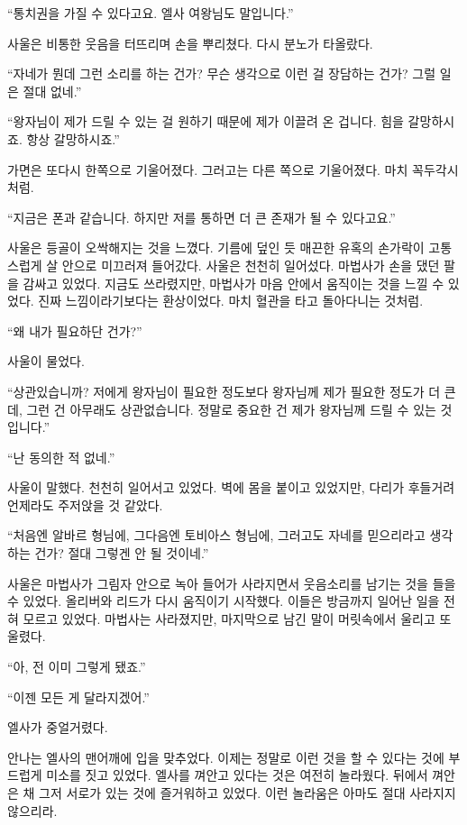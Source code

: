 ``통치권을 가질 수 있다고요. 엘사 여왕님도 말입니다.''

사울은 비통한 웃음을 터뜨리며 손을 뿌리쳤다. 다시 분노가 타올랐다.

``자네가 뭔데 그런 소리를 하는 건가? 무슨 생각으로 이런 걸 장담하는 건가? 그럴 일은 절대 없네.''

``왕자님이 제가 드릴 수 있는 걸 원하기 때문에 제가 이끌려 온 겁니다. 힘을 갈망하시죠. 항상 갈망하시죠.''

가면은 또다시 한쪽으로 기울어졌다. 그러고는 다른 쪽으로 기울어졌다. 마치 꼭두각시처럼.

``지금은 폰과 같습니다. 하지만 저를 통하면 더 큰 존재가 될 수 있다고요.''

사울은 등골이 오싹해지는 것을 느꼈다. 기름에 덮인 듯 매끈한 유혹의 손가락이 고통스럽게 살 안으로 미끄러져 들어갔다. 사울은 천천히 일어섰다. 마법사가 손을 댔던 팔을 감싸고 있었다. 지금도 쓰라렸지만, 마법사가 마음 안에서 움직이는 것을 느낄 수 있었다. 진짜 느낌이라기보다는 환상이었다. 마치 혈관을 타고 돌아다니는 것처럼.

``왜 내가 필요하단 건가?''

사울이 물었다.

``상관있습니까? 저에게 왕자님이 필요한 정도보다 왕자님께 제가 필요한 정도가 더 큰데, 그런 건 아무래도 상관없습니다. 정말로 중요한 건 제가 왕자님께 드릴 수 있는 것입니다.''

``난 동의한 적 없네.''

사울이 말했다. 천천히 일어서고 있었다. 벽에 몸을 붙이고 있었지만, 다리가 후들거려 언제라도 주저앉을 것 같았다.

``처음엔 알바르 형님에, 그다음엔 토비아스 형님에, 그러고도 자네를 믿으리라고 생각하는 건가? 절대 그렇겐 안 될 것이네.''

사울은 마법사가 그림자 안으로 녹아 들어가 사라지면서 웃음소리를 남기는 것을 들을 수 있었다. 올리버와 리드가 다시 움직이기 시작했다. 이들은 방금까지 일어난 일을 전혀 모르고 있었다. 마법사는 사라졌지만, 마지막으로 남긴 말이 머릿속에서 울리고 또 울렸다.

``아, 전 이미 그렇게 됐죠.''

\textbreak

\forceindent``이젠 모든 게 달라지겠어.''

엘사가 중얼거렸다.

안나는 엘사의 맨어깨에 입을 맞추었다. 이제는 정말로 이런 것을 할 수 있다는 것에 부드럽게 미소를 짓고 있었다. 엘사를 껴안고 있다는 것은 여전히 놀라웠다. 뒤에서 껴안은 채 그저 서로가 있는 것에 즐거워하고 있었다. 이런 놀라움은 아마도 절대 사라지지 않으리라.

